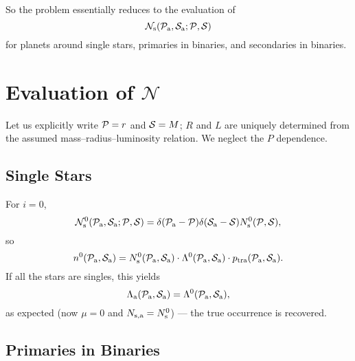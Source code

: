 \documentclass[12pt,modern]{aastex61}
\begin{document}
So the problem essentially reduces to the evaluation of
\begin{equation}
	\mathcal{N}_{\rm s}(\pp\a,\ps\a; \pp, \ps)
\end{equation}
for planets around single stars, primaries in binaries, and secondaries in binaries. 

\section{Evaluation of $\mathcal{N}$}

Let us explicitly write $\mathcal{P}=r$ and $\mathcal{S}=M$; $R$ and $L$ are uniquely determined from the assumed mass--radius--luminosity relation. We neglect the $P$ dependence.

\subsection{Single Stars}

For $i=0$, 
\begin{equation}
	\mathcal{N}_{\rm s}^0(\pp\a,\ps\a; \pp, \ps)
	=\delta(\pp\a-\pp)\delta(\ps\a-\ps) N\s^0(\pp,\ps),
\end{equation}
so
\begin{equation}
	n^0(\pp\a, \ps\a)=N\s^0(\pp\a,\ps\a)\cdot \Lambda^0(\pp\a, \ps\a) \cdot p_{\rm tra}(\pp\a, \ps\a).
\end{equation}
If all the stars are singles, this yields
\begin{equation}
	\Lambda\a(\pp\a, \ps\a)=\Lambda^0(\pp\a, \ps\a),
\end{equation}
as expected (now $\mu=0$ and $N_{\rm s,a}=N_{\rm s}^0$) --- the true occurrence is recovered.

\subsection{Primaries in Binaries}
\end{document}
